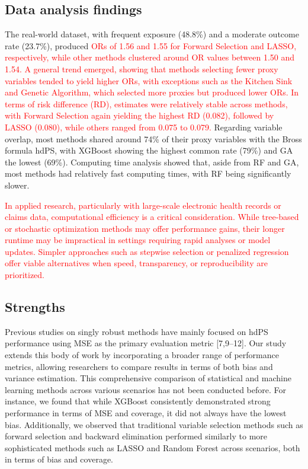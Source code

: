 \documentclass[10pt,letterpaper]{article}
\begin{document}
\subsection{Data analysis findings}\label{data-analysis-findings}

The real-world dataset, with frequent exposure (48.8\%) and a moderate
outcome rate (23.7\%), produced
\textcolor{red}{ORs of 1.56 and 1.55 for Forward Selection and LASSO, respectively, while other methods clustered around OR values between 1.50 and 1.54. A general trend emerged, showing that methods selecting fewer proxy variables tended to yield higher ORs, with exceptions such as the Kitchen Sink and Genetic Algorithm, which selected more proxies but produced lower ORs. In terms of risk difference (RD), estimates were relatively stable across methods, with Forward Selection again yielding the highest RD (0.082), followed by LASSO (0.080), while others ranged from 0.075 to 0.079.}
Regarding variable overlap, most methods shared around 74\% of their
proxy variables with the Bross formula hdPS, with XGBoost showing the
highest common rate (79\%) and GA the lowest (69\%). Computing time
analysis showed that, aside from RF and GA, most methods had relatively
fast computing times, with RF being significantly slower.

\textcolor{red}{In applied research, particularly with large-scale electronic health records or claims data, computational efficiency is a critical consideration. While tree-based or stochastic optimization methods may offer performance gains, their longer runtime may be impractical in settings requiring rapid analyses or model updates. Simpler approaches such as stepwise selection or penalized regression offer viable alternatives when speed, transparency, or reproducibility are prioritized.}

\subsection{Strengths}\label{strengths}

Previous studies on singly robust methods have mainly focused on hdPS
performance using MSE as the primary evaluation metric {[}7,9--12{]}.
Our study extends this body of work by incorporating a broader range of
performance metrics, allowing researchers to compare results in terms of
both bias and variance estimation. This comprehensive comparison of
statistical and machine learning methods across various scenarios has
not been conducted before. For instance, we found that while XGBoost
consistently demonstrated strong performance in terms of MSE and
coverage, it did not always have the lowest bias. Additionally, we
observed that traditional variable selection methods such as forward
selection and backward elimination performed similarly to more
sophisticated methods such as LASSO and Random Forest across scenarios,
both in terms of bias and coverage.
\end{document}
